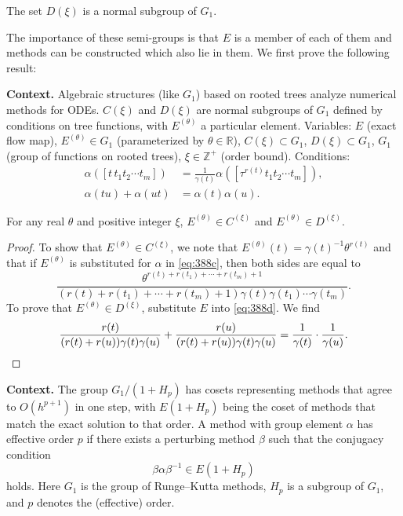\begin{theorem}
\begin{theorem}

  \label{thm:388G}
The set $D(\xi)$ is a normal subgroup of $G_1$.

The importance of these semi-groups is that $E$ is a member of each of them and methods can be constructed which also lie in them. We first prove the following result:
\end{theorem}

\noindent\textbf{Context.}
Algebraic structures (like $G_1$) based on rooted trees analyze numerical methods for ODEs. $C(\xi)$ and $D(\xi)$ are normal subgroups of $G_1$ defined by conditions on tree functions, with $E^{(\theta)}$ a particular element. Variables: $E$ (exact flow map), $E^{(\theta)}\in G_1$ (parameterized by $\theta\in\mathbb{R}$), $C(\xi)\subset G_1$, $D(\xi)\subset G_1$, $G_1$ (group of functions on rooted trees), $\xi\in\mathbb{Z}^+$ (order bound). Conditions:
\begin{align}
\alpha([t\,t_1 t_2 \cdots t_m]) &= \frac{1}{\gamma(t)}\alpha([\tau^{r(t)} t_1 t_2 \cdots t_m]), \\
\alpha(tu) + \alpha(ut) &= \alpha(t)\alpha(u).
\end{align}

\begin{theorem}

  \label{thm:388H}
For any real $\theta$ and positive integer $\xi$, $E^{(\theta)} \in C^{(\xi)}$ and
$E^{(\theta)} \in D^{(\xi)}$.
\end{theorem}

\begin{proof}
To show that $E^{(\theta)} \in C^{(\xi)}$, we note that $E^{(\theta)}(t) = \gamma(t)^{-1} \theta^{r(t)}$ and that
if $E^{(\theta)}$ is substituted for $\alpha$ in \eqref{eq:388c}, then both sides are equal to
\[
\frac{\theta^{r(t)+r(t_1)+\cdots+r(t_m)+1}}{(r(t) + r(t_1) + \cdots + r(t_m) + 1)\gamma(t)\gamma(t_1) \cdots \gamma(t_m)}.
\]
To prove that $E^{(\theta)} \in D^{(\xi)}$, substitute $E$ into \eqref{eq:388d}. We find
\[
\frac{r(t)}{(r(t) + r(u))\gamma(t)\gamma(u)} + \frac{r(u)}{(r(t) + r(u))\gamma(t)\gamma(u)} = \frac{1}{\gamma(t)} \cdot \frac{1}{\gamma(u)}. \qedhere
\]
\end{proof}

\noindent\textbf{Context.}
The group $G_1/(1+H_p)$ has cosets representing methods that agree to $O(h^{p+1})$ in one step, with $E(1+H_p)$ being the coset of methods that match the exact solution to that order. A method with group element $\alpha$ has effective order $p$ if there exists a perturbing method $\beta$ such that the conjugacy condition
\[
\beta\alpha\beta^{-1} \in E(1 + H_p)
\]
holds. Here $G_1$ is the group of Runge--Kutta methods, $H_p$ is a subgroup of $G_1$, and $p$ denotes the (effective) order.


\end{theorem}
